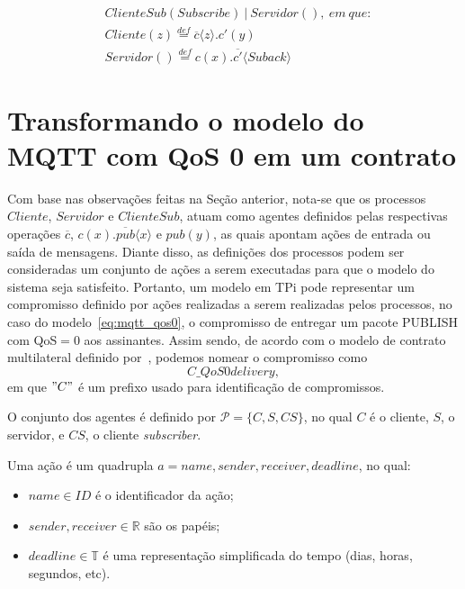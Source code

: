 \begin{align}
& ClienteSub(Subscribe)~|~Servidor(),~em~que: \nonumber \\
& Cliente(z) \stackrel{def}{=} \overline{c}\langle z \rangle . c'(y) \nonumber \\
& Servidor() \stackrel{def}{=} c(x). \overline{c'}\langle Suback \rangle
\end{align}   

\section{Transformando o modelo do MQTT com QoS 0 em um contrato}

Com base nas observações feitas na Seção anterior, nota-se que os processos $Cliente$, $Servidor$ e $ClienteSub$, atuam como agentes definidos pelas respectivas operações $\overline{c}$, $c(x).\overline{pub}\langle x \rangle$ e $pub(y)$, as quais apontam ações de entrada ou saída de mensagens. Diante disso, as definições dos processos podem ser consideradas um conjunto de ações a serem executadas para que o modelo do sistema seja satisfeito. Portanto, um modelo em TPi pode representar um compromisso definido por ações realizadas a serem realizadas pelos processos, no caso do modelo~\ref{eq:mqtt_qos0}, o compromisso de entregar um pacote PUBLISH com QoS$=0$  aos assinantes. Assim sendo, de acordo com o modelo de contrato multilateral definido por~\citeauthor{xu2004multi}, podemos nomear o compromisso como $$C\_QoS0delivery,$$ em que $"C"$ é um prefixo usado para identificação de compromissos. 

O conjunto dos agentes é definido por $\mathcal{P} = \{C, S, CS\}$, no qual $C$ é o cliente, $S$, o servidor, e $CS$, o cliente \textit{subscriber}.

Uma ação é um quadrupla $a = name, sender, receiver, deadline$, no qual:
\begin{itemize}
	\item $name \in ID$ é o identificador da ação;
	\item $sender, receiver \in \mathbb{R}$ são os papéis;
	\item $deadline \in \mathbb{T}$ é uma representação simplificada do tempo (dias, horas, segundos, etc).
\end{itemize}


